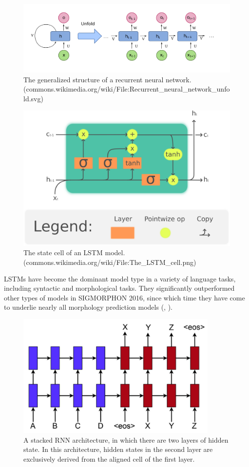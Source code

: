 \begin{figure}[t]
\includegraphics[width=12cm]{images/RNN.png}
\centering
\caption{The generalized structure of a recurrent neural network. (commons.wikimedia.org/wiki/File:Recurrent\_neural\_network\_unfold.svg)}
\end{figure}

\begin{figure}[t]
\includegraphics[width=12cm]{images/The_LSTM_cell.png}
\centering
\caption{The state cell of an LSTM model. (commons.wikimedia.org/wiki/File:The\_LSTM\_cell.png)}
\end{figure}

LSTMs have become the dominant model type in a variety of language tasks, including syntactic and morphological tasks. They significantly outperformed other types of models in SIGMORPHON 2016, since which time they have come to underlie nearly all morphology prediction models (\cite{Cotterell2016}, \cite{Cotterell2017a}).

\begin{figure}[t]
\includegraphics[width=10cm]{images/stacked.png}
\centering
\caption{A stacked RNN architecture, in which there are two layers of hidden state. In this architecture, hidden states in the second layer are exclusively derived from the aligned cell of the first layer. \parencite{Luong2015}}
\end{figure}


